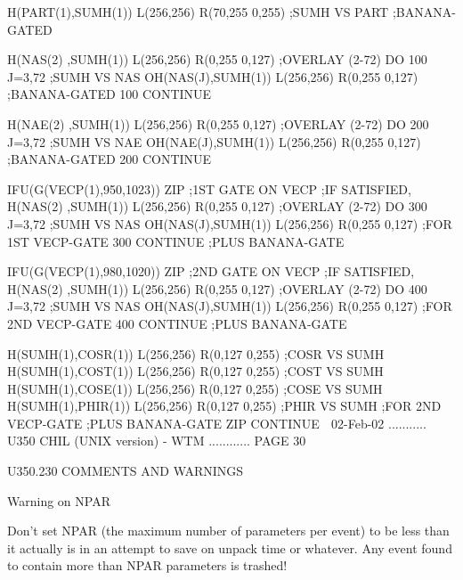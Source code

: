          H(PART(1),SUMH(1)) L(256,256) R(70,255 0,255) ;SUMH VS PART
                                                       ;BANANA-GATED
 
         H(NAS(2) ,SUMH(1)) L(256,256) R(0,255 0,127)  ;OVERLAY (2-72)
         DO 100 J=3,72                                 ;SUMH VS NAS
         OH(NAS(J),SUMH(1)) L(256,256) R(0,255 0,127)  ;BANANA-GATED
     100 CONTINUE
 
         H(NAE(2) ,SUMH(1)) L(256,256) R(0,255 0,127)  ;OVERLAY (2-72)
         DO 200 J=3,72                                 ;SUMH VS NAE
         OH(NAE(J),SUMH(1)) L(256,256) R(0,255 0,127)  ;BANANA-GATED
     200 CONTINUE
 
         IFU(G(VECP(1),950,1023)) ZIP                  ;1ST GATE ON VECP
                                                       ;IF SATISFIED,
         H(NAS(2) ,SUMH(1)) L(256,256) R(0,255 0,127)  ;OVERLAY (2-72)
         DO 300 J=3,72                                 ;SUMH VS NAS
         OH(NAS(J),SUMH(1)) L(256,256) R(0,255 0,127)  ;FOR 1ST VECP-GATE
     300 CONTINUE                                      ;PLUS BANANA-GATE
 
         IFU(G(VECP(1),980,1020)) ZIP                  ;2ND GATE ON VECP
                                                       ;IF SATISFIED,
         H(NAS(2) ,SUMH(1)) L(256,256) R(0,255 0,127)  ;OVERLAY (2-72)
         DO 400 J=3,72                                 ;SUMH VS NAS
         OH(NAS(J),SUMH(1)) L(256,256) R(0,255 0,127)  ;FOR 2ND VECP-GATE
     400 CONTINUE                                      ;PLUS BANANA-GATE
 
         H(SUMH(1),COSR(1)) L(256,256) R(0,127 0,255)  ;COSR VS SUMH
         H(SUMH(1),COST(1)) L(256,256) R(0,127 0,255)  ;COST VS SUMH
         H(SUMH(1),COSE(1)) L(256,256) R(0,127 0,255)  ;COSE VS SUMH
         H(SUMH(1),PHIR(1)) L(256,256) R(0,127 0,255)  ;PHIR VS SUMH
                                                       ;FOR 2ND VECP-GATE
                                                       ;PLUS BANANA-GATE
   ZIP   CONTINUE
    
   02-Feb-02 ........... U350  CHIL (UNIX version) - WTM ............ PAGE  30
 
 
 
   U350.230  COMMENTS AND WARNINGS
 
                                 Warning on NPAR
 
   Don't set NPAR (the maximum number of parameters  per  event)  to  be  less
   than  it  actually is in an attempt to save on unpack time or whatever. Any
   event found to contain more than NPAR parameters is trashed!
 
